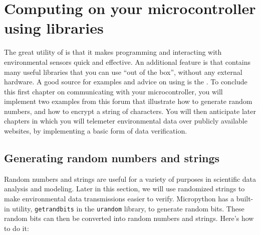 \section{Computing on your microcontroller using \Micropython libraries}
The great utility of \Micropython is that it makes programming and interacting with environmental sensors quick and effective.
An additional feature is that \Micropython contains many useful libraries that you can use ``out of the box'', without any external hardware.
A good source for examples and advice on using \Micropython is the .
To conclude this first chapter on communicating with your microcontroller, you will implement two examples from this forum that illustrate how to generate random numbers, and how to encrypt a string of characters.
You will then anticipate later chapters in which you will telemeter environmental data over publicly available websites, by implementing a basic form of data verification.

\subsection{Generating random numbers and strings}
Random numbers and strings are useful for a variety of purposes in scientific data analysis and modeling.
Later in this section, we will use randomized strings to make environmental data transmissions easier to verify.
Micropython has a built-in utility, \lstinline{getrandbits} in the \lstinline{urandom} library, to generate random bits.
These random bits can then be converted into random numbers and strings. Here's how to do it:

